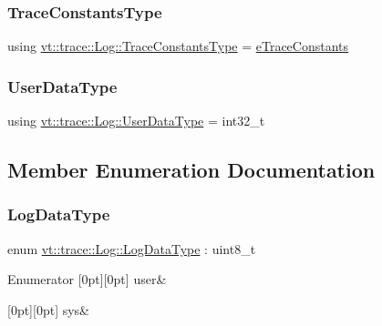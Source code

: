 \subsubsection{\texorpdfstring{Trace\+Constants\+Type}{TraceConstantsType}}
{\footnotesize\ttfamily using \hyperlink{namespacevt_1_1trace_acf454dfbd581b0ebae895f90b5927a1d}{vt\+::trace\+::\+Log\+::\+Trace\+Constants\+Type} =  \hyperlink{namespacevt_1_1trace_acf454dfbd581b0ebae895f90b5927a1d}{e\+Trace\+Constants}}

\mbox{\label{structvt_1_1trace_1_1_log_af392c3825bf45d286a0f77bddf7a96cf}} 
\subsubsection{\texorpdfstring{User\+Data\+Type}{UserDataType}}
{\footnotesize\ttfamily using \hyperlink{structvt_1_1trace_1_1_log_af392c3825bf45d286a0f77bddf7a96cf}{vt\+::trace\+::\+Log\+::\+User\+Data\+Type} =  int32\+\_\+t}



\subsection{Member Enumeration Documentation}
\mbox{\label{structvt_1_1trace_1_1_log_ae1c08093fd18967b7d4912d04d6acc3d}} 
\subsubsection{\texorpdfstring{Log\+Data\+Type}{LogDataType}}
{\footnotesize\ttfamily enum \hyperlink{structvt_1_1trace_1_1_log_ae1c08093fd18967b7d4912d04d6acc3d}{vt\+::trace\+::\+Log\+::\+Log\+Data\+Type} \+: uint8\+\_\+t}

\begin{DoxyEnumFields}{Enumerator}
[0pt][0pt]{}\mbox{\label{structvt_1_1trace_1_1_log_ae1c08093fd18967b7d4912d04d6acc3da14b709efcf6184d83649a7b3ce6cf8ca}} 
user&\\
\hline

[0pt][0pt]{}\mbox{\label{structvt_1_1trace_1_1_log_ae1c08093fd18967b7d4912d04d6acc3da4cef9fb4034808a9f6c627a664c86b93}} 
sys&\\
\hline

\end{DoxyEnumFields}


